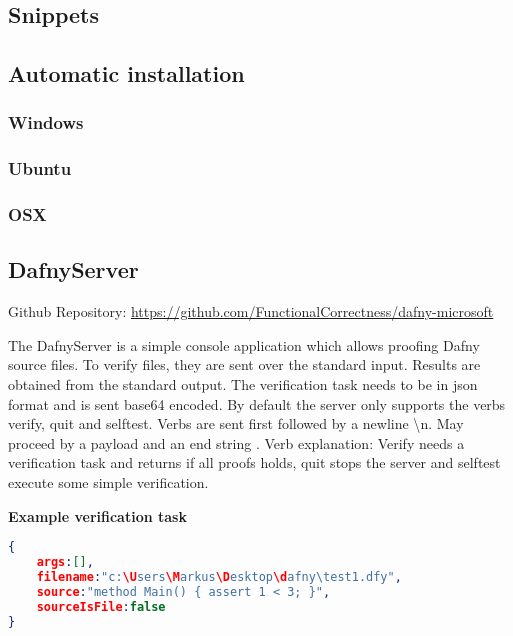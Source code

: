 \subsection{Snippets}

\subsection{Automatic installation}
\subsubsection{Windows}

\subsubsection{Ubuntu}

\subsubsection{OSX}


\subsection{DafnyServer}
Github Repository: \href{https://github.com/FunctionalCorrectness/dafny-microsoft}{https://github.com/FunctionalCorrectness/dafny-microsoft}

The DafnyServer is a simple console application which allows proofing Dafny source files. To verify files, they are sent over the standard input. Results are obtained from the standard output. The verification task needs to be in json format  and is sent base64 encoded. By default the server only supports the verbs verify, quit and selftest. Verbs are sent first followed by a newline \textbackslash{n}. May proceed by a payload and an end string . 
Verb explanation: Verify needs a verification task and returns if all proofs holds, quit stops the server and selftest execute some simple verification. 

\textbf{Example verification task}
\begin{lstlisting}[language=json,firstnumber=1]
{
	args:[],
	filename:"c:\Users\Markus\Desktop\dafny\test1.dfy",
	source:"method Main() {	assert 1 < 3; }",
	sourceIsFile:false
}

\end{lstlisting}


